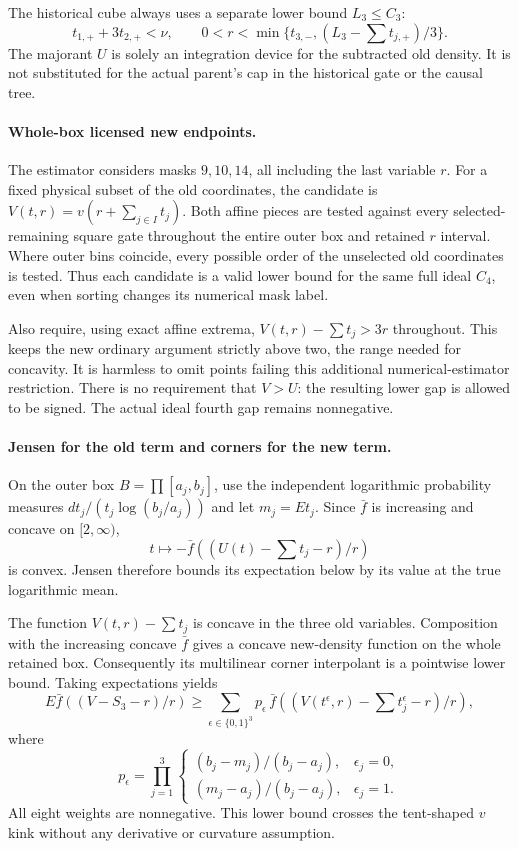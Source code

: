 The historical cube always uses a separate lower bound $L_3\le C_3$:
\[
 t_{1,+}+3t_{2,+}<\nu,\qquad
 0<r<\min\{t_{3,-},(L_3-\textstyle\sum t_{j,+})/3\}.
\]
The majorant $U$ is solely an integration device for the subtracted
old density. It is not substituted for the actual parent's cap in
the historical gate or the causal tree.

\paragraph{Whole-box licensed new endpoints.}
The estimator considers masks $9,10,14$, all including the last
variable $r$. For a fixed physical subset of the old coordinates,
the candidate is $V(t,r)=v(r+\sum_{j\in I}t_j)$.
Both affine pieces are tested against every selected-remaining
square gate throughout the entire outer box and retained $r$ interval.
Where outer bins coincide, every possible order of the unselected
old coordinates is tested. Thus each candidate is a valid lower
bound for the same full ideal $C_4$, even when sorting changes its
numerical mask label.

Also require, using exact affine extrema,
$V(t,r)-\sum t_j>3r$ throughout. This keeps the new ordinary argument
strictly above two, the range needed for concavity. It is harmless
to omit points failing this additional numerical-estimator restriction.
There is no requirement that $V>U$: the resulting lower gap is
allowed to be signed. The actual ideal fourth gap remains nonnegative.

\paragraph{Jensen for the old term and corners for the new term.}
On the outer box $B=\prod[a_j,b_j]$, use the independent logarithmic
probability measures $dt_j/(t_j\log(b_j/a_j))$ and let $m_j=Et_j$.
Since $\bar f$ is increasing and concave on $[2,\infty)$,
\[
 t\longmapsto -\bar f((U(t)-\sum t_j-r)/r)
\]
is convex. Jensen therefore bounds its expectation below by its
value at the true logarithmic mean.

The function $V(t,r)-\sum t_j$ is concave in the three old variables.
Composition with the increasing concave $\bar f$ gives a concave
new-density function on the whole retained box. Consequently its
multilinear corner interpolant is a pointwise lower bound. Taking
expectations yields
\[
 E\bar f((V-S_3-r)/r)
 \ge\sum_{\epsilon\in\{0,1\}^3}
 p_\epsilon\,
 \bar f((V(t^\epsilon,r)-\sum t_j^\epsilon-r)/r),
\]
where
\[
 p_\epsilon=\prod_{j=1}^3
 \begin{cases}
 (b_j-m_j)/(b_j-a_j),&\epsilon_j=0,\\
 (m_j-a_j)/(b_j-a_j),&\epsilon_j=1.
 \end{cases}
\]
All eight weights are nonnegative. This lower bound crosses the
tent-shaped $v$ kink without any derivative or curvature assumption.

